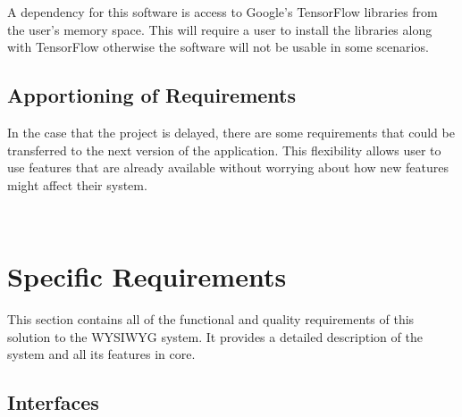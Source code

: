 \documentclass[journal,10pt,onecolumn,compsoc]{IEEEtran} \usepackage[margin=1.0in]{geometry} \usepackage{pdfpages} \usepackage{graphicx}
\begin{document}
A dependency for this software is access to Google's TensorFlow libraries from the user's memory space. 
This will require a user to install the libraries along with TensorFlow otherwise the software will not be usable in some scenarios.

\subsection{Apportioning of Requirements}

In the case that the project is delayed, there are some requirements that could be transferred to the next version of the application. 
This flexibility allows user to use features that are already available without worrying about how new features might affect their system.

\begin{minipage}{\textwidth}
		\\
	\end{minipage}


\newpage

\section{Specific Requirements}

This section contains all of the functional and quality requirements of this solution to the WYSIWYG system. 
It provides a detailed description of the system and all its features in core.


\subsection{Interfaces}
\end{document}
